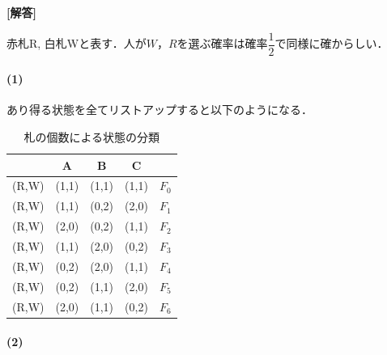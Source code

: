 \documentclass[../../main.tex]{subfiles}
\begin{document}
\begin{oframed}
  
\end{oframed}

{\bf [解答]}

赤札R, 白札Wと表す．人が$W$，$R$を選ぶ確率は確率$\dfrac{1}{2}$で同様に確からしい．

\paragraph{(1)}

あり得る状態を全てリストアップすると以下のようになる．

\begin{table}[htb]
  \centering
  \caption{札の個数による状態の分類}
  \begin{tabular}{|c|c|c|c|l|}
    \hline
    & A & B & C & \\ \hline
    (R,W) & (1,1) & (1,1) & (1,1) & $F_0$ \\ \hline
    (R,W) & (1,1) & (0,2) & (2,0) & $F_1$ \\ \hline
    (R,W) & (2,0) & (0,2) & (1,1) & $F_2$ \\ \hline
    (R,W) & (1,1) & (2,0) & (0,2) & $F_3$ \\ \hline
    (R,W) & (0,2) & (2,0) & (1,1) & $F_4$ \\ \hline
    (R,W) & (0,2) & (1,1) & (2,0) & $F_5$ \\ \hline
    (R,W) & (2,0) & (1,1) & (0,2) & $F_6$ \\ \hline
  \end{tabular}
\end{table}

\paragraph{(2)}
\end{document}
